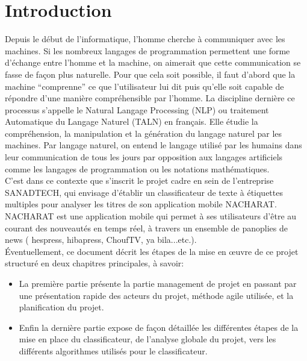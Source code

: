 
\chapter*{Introduction}
Depuis le début de l’informatique, l’homme cherche à communiquer avec les machines. Si les nombreux langages de programmation permettent une forme d’échange entre l’homme et la machine, on aimerait que cette communication se fasse de façon plus naturelle. Pour que cela soit possible, il faut d’abord que la machine “comprenne” ce que l’utilisateur lui dit puis qu’elle soit capable de répondre d’une manière compréhensible par l’homme. La discipline dernière ce processus s’appelle le Natural Langage Processing (NLP) ou traitement Automatique du Langage Naturel (TALN) en français. Elle étudie la compréhension, la manipulation et la génération du langage naturel par les machines. Par langage naturel, on entend le langage utilisé par les humains dans leur communication de tous les jours par opposition aux langages artificiels comme les langages de programmation ou les notations mathématiques.\\
C'est dans ce contexte que s'inscrit le projet cadre en sein de l'entreprise SANADTECH, qui envisage d'établir un classificateur de texte à étiquettes multiples pour analyser les titres de son application mobile NACHARAT.\\
NACHARAT est une application mobile qui permet à ses utilisateurs d'être au courant des nouveautés en temps réel, à travers un ensemble de panoplies de news ( hespress, hibapress, ChoufTV, ya bila...etc.).\\ 
Éventuellement, ce document décrit les étapes de la mise en œuvre de ce projet structuré en deux chapitres principales, à savoir:

\begin{itemize}
\item La première partie présente la partie management de projet en passant par une présentation rapide des acteurs du projet, méthode agile utilisée, et la planification du projet.
\item Enfin la dernière partie expose de façon détaillée les différentes étapes de la mise en place du classificateur, de l'analyse globale du projet, vers les différents algorithmes utilisés pour le classificateur.
\end{itemize}